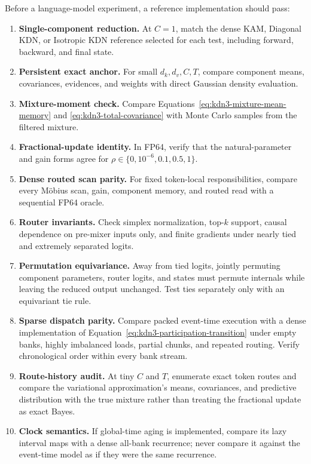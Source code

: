 \documentclass[11pt]{article}
\begin{document}
Before a language-model experiment, a reference implementation should pass:
\begin{enumerate}
  \item \textbf{Single-component reduction.}  At $C=1$, match the dense KAM, Diagonal KDN, or
        Isotropic KDN reference selected for each test, including forward, backward, and final
        state.
  \item \textbf{Persistent exact anchor.}  For small $d_k,d_v,C,T$, compare component means,
        covariances, evidences, and weights with direct Gaussian density evaluation.
  \item \textbf{Mixture-moment check.}  Compare Equations~\eqref{eq:kdn3-mixture-mean-memory} and
        \eqref{eq:kdn3-total-covariance} with Monte Carlo samples from the filtered mixture.
  \item \textbf{Fractional-update identity.}  In FP64, verify that the natural-parameter and gain
        forms agree for $\rho\in\{0,10^{-6},0.1,0.5,1\}$.
  \item \textbf{Dense routed scan parity.}  For fixed token-local responsibilities, compare every
        M\"obius scan, gain, component memory, and routed read with a sequential FP64 oracle.
  \item \textbf{Router invariants.}  Check simplex normalization, top-$k$ support, causal
        dependence on pre-mixer inputs only, and finite gradients under nearly tied and extremely
        separated logits.
  \item \textbf{Permutation equivariance.}  Away from tied logits, jointly permuting component
        parameters, router logits, and states must permute internals while leaving the reduced
        output unchanged.  Test ties separately only with an equivariant tie rule.
  \item \textbf{Sparse dispatch parity.}  Compare packed event-time execution with a dense
        implementation of Equation~\eqref{eq:kdn3-participation-transition} under empty banks,
        highly imbalanced loads, partial chunks, and repeated routing.  Verify chronological order
        within every bank stream.
  \item \textbf{Route-history audit.}  At tiny $C$ and $T$, enumerate exact token routes and compare
        the variational approximation's means, covariances, and predictive distribution with the
        true mixture rather than treating the fractional update as exact Bayes.
  \item \textbf{Clock semantics.}  If global-time aging is implemented, compare its lazy interval
        maps with a dense all-bank recurrence; never compare it against the event-time model as if
        they were the same recurrence.
\end{enumerate}
\end{document}
